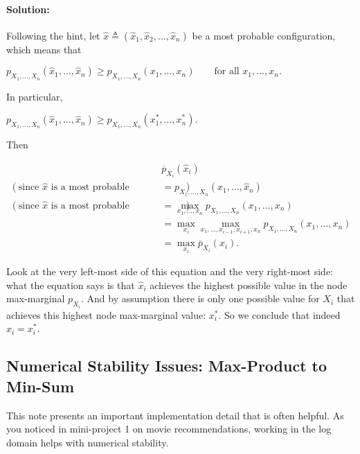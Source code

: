 \documentclass[6008notes.tex]{subfiles}
\begin{document}
\paragraph{Solution:} Following the hint, let $\widehat{x}\triangleq (\widehat{x}_1, \widehat{x}_2, \dots , \widehat{x}_ n)$ be a most probable configuration, which means that

{\centering$p_{X_1,\dots ,X_ n}(\widehat{x}_1, \dots , \widehat{x}_ n) \ge p_{X_1,\dots ,X_ n}(x_1, \dots , x_ n)\qquad \text {for all }x_1,\dots ,x_ n.$ \par}
 
In particular,

{\centering$p_{X_1,\dots ,X_ n}(\widehat{x}_1, \dots , \widehat{x}_ n) \ge p_{X_1,\dots ,X_ n}(x_1^*, \dots , x_ n^*).$ \par}
 
Then

\begin{eqnarray*}
&&\overline{p}_{X_i}(\widehat{x}_i) \\
(\text{since }\widehat{x}\text{ is a most probable configuration})
&&= p_{X_1, \dots, X_n}(\widehat{x}_1, \dots, \widehat{x}_n) \\
(\text{since }\widehat{x}\text{ is a most probable configuration})
&&= \max_{x_1, \dots, x_n}
      p_{X_1, \dots, X_n}(x_1, \dots, x_n) \\
&&= \max_{x_i} \max_{x_1, \dots, x_{i-1}, x_{i+1}, x_n}
      p_{X_1, \dots, X_n}(x_1, \dots, x_n) \\
&&= \max_{x_i} \overline{p}_{X_i}(x_i).
\end{eqnarray*}

Look at the very left-most side of this equation and the very right-most side: what the equation says is that $\widehat{x}_ i$ achieves the highest possible value in the node max-marginal $p_{X_i}$. And by assumption there is only one possible value for $X_i$ that achieves this highest node max-marginal value: $x_i^*$. So we conclude that indeed $\widehat{x}_ i = x_ i^*$.


\subsection{Numerical Stability Issues: Max-Product to Min-Sum}

This note presents an important implementation detail that is often helpful. As you noticed in mini-project 1 on movie recommendations, working in the log domain helps with numerical stability.
\end{document}
